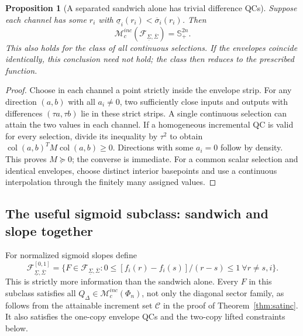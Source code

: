\documentclass[10pt,a4paper]{article}
\newtheorem{proposition}{Proposition}
\theoremstyle{definition}
\theoremstyle{remark}
\newcommand{\Ss}{\mathbb S}
\newcommand{\col}{\operatorname{col}}
\newcommand{\mc}{\mathcal M_c}
\newcommand{\Fenv}{\mathcal F_{\underline\Sigma,\overline\Sigma}}
\begin{document}
\begin{proposition}[A separated sandwich alone has trivial difference QCs]\label{prop:collapse}
Suppose each channel has some $r_i$ with $\underline\sigma_i(r_i)<\overline\sigma_i(r_i)$. Then
\begin{equation}\label{eq:trivial}
 \boxed{\mc^{inc}(\Fenv)=\Ss_+^{2n}.}
\end{equation}
This also holds for the class of all continuous selections. If the envelopes coincide identically, this conclusion need not hold; the class then reduces to the prescribed function.
\end{proposition}
\begin{proof}
Choose in each channel a point strictly inside the envelope strip. For any direction $(a,b)$ with all $a_i\ne0$, two sufficiently close inputs and outputs with differences $(\tau a,\tau b)$ lie in these strict strips. A single continuous selection can attain the two values in each channel. If a homogeneous incremental QC is valid for every selection, divide its inequality by $\tau^2$ to obtain $\col(a,b)^TM\col(a,b)\ge0$. Directions with some $a_i=0$ follow by density. This proves $M\succeq0$; the converse is immediate. For a common scalar selection and identical envelopes, choose distinct interior basepoints and use a continuous interpolation through the finitely many assigned values.
\end{proof}

\subsection{The useful sigmoid subclass: sandwich and slope together}
For normalized sigmoid slopes define
\begin{equation}\label{eq:sigclass}
 \Fenv^{[0,1]}=\{F\in\Fenv:0\le[f_i(r)-f_i(s)]/(r-s)\le1
 \ \forall r\ne s,i\}.
\end{equation}
This is strictly more information than the sandwich alone. Every $F$ in this subclass satisfies all $Q_\Delta\in\mc^{inc}(\Phi_n)$, not only the diagonal sector family, as follows from the attainable increment set $\mathcal C$ in the proof of Theorem~\ref{thm:satinc}. It also satisfies the one-copy envelope QCs and the two-copy lifted constraints below.
\end{document}
